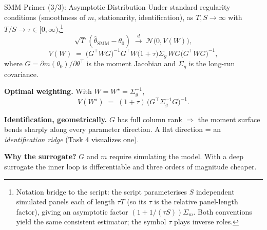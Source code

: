 \documentclass[10pt,aspectratio=169]{beamer}
\begin{document}
\begin{frame}{SMM Primer (3/3): Asymptotic Distribution}
\small
Under standard regularity conditions (smoothness of $m$, stationarity, identification), as $T,S\to\infty$ with $T/S \to \tau \in [0,\infty)$,\footnote{\scriptsize Notation bridge to the script: the script parameterises $S$ independent simulated panels each of length $\tau T$ (so its $\tau$ is the relative panel-length factor), giving an asymptotic factor $(1+1/(\tau S))\Sigma_m$. Both conventions yield the same consistent estimator; the symbol $\tau$ plays inverse roles.}
\[
    \sqrt{T}\,(\widehat\theta_{\text{SMM}} - \theta_0)
    \;\xrightarrow{d}\; \mathcal{N}\bigl(0, V(W)\bigr),
\]
\[
    V(W) \;=\; \bigl(G^\top W G\bigr)^{-1} G^\top W \bigl(1 + \tau\bigr)\Sigma_g\, W G \bigl(G^\top W G\bigr)^{-1},
\]
where $G = \partial m(\theta_0)/\partial\theta^\top$ is the moment Jacobian and $\Sigma_g$ is the long-run covariance.

\vspace{0.3em}
\textbf{Optimal weighting.} With $W = W^\star = \Sigma_g^{-1}$,
\[
    V(W^\star) \;=\; (1+\tau)\,\bigl(G^\top \Sigma_g^{-1} G\bigr)^{-1}.
\]

\vspace{0.3em}
\textbf{Identification, geometrically.} $G$ has full column rank $\Rightarrow$ the moment surface bends sharply along every parameter direction. A flat direction = an \emph{identification ridge} (Task 4 visualizes one).

\vspace{0.3em}
\textbf{Why the surrogate?} $G$ and $m$ require simulating the model. With a deep surrogate the inner loop is differentiable and three orders of magnitude cheaper.
\end{frame}
\end{document}
